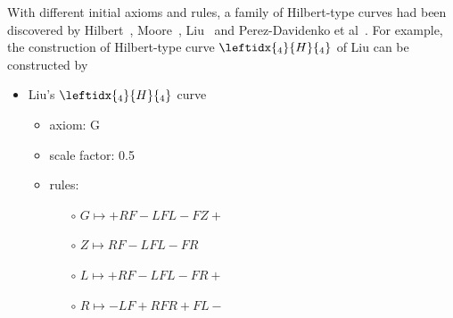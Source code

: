 \documentclass{article}
\begin{document}
With different initial axioms and rules, a family of Hilbert-type curves had been discovered by
Hilbert~\cite{Sagan1994SpacefillingC1}, Moore~\cite{Sagan1994SpacefillingC2}, Liu~\cite{Liu2004FourAP} and
Perez-Davidenko et al~\cite{PrezDemydenko2013LocalityPH}.
For example, the construction of Hilbert-type curve $\leftidx{_4}{H}{_4}$ of Liu can be constructed by

\begin{itemize}
    \label{rule:liu-curve}
    \item Liu's $\leftidx{_4}{H}{_4}$ curve
    \begin{itemize}
      \item axiom: G
      \item scale factor: 0.5
      \item rules: \begin{itemize}
          \item[$\circ$] $G \mapsto +RF-LFL-FZ+ $
          \item[$\circ$] $Z \mapsto RF-LFL-FR $
          \item[$\circ$] $L \mapsto +RF-LFL-FR+ $
          \item[$\circ$] $R \mapsto -LF+RFR+FL- $
      \end{itemize}
    \end{itemize}
\end{itemize}

\end{document}

